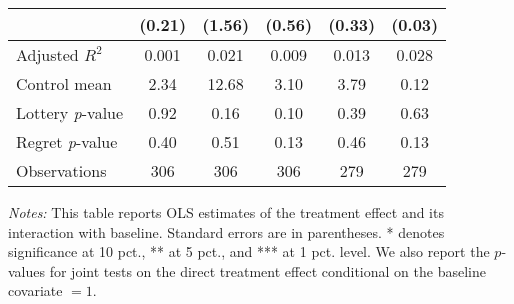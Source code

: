 \begin{table}[htbp]
{\begin{threeparttable}
\begin{tabular}{l*{5}{c}}
                &   (0.21)         &   (1.56)         &   (0.56)         &   (0.33)         &   (0.03)         \\
\midrule
Adjusted \(R^{2}\)&    0.001         &    0.021         &    0.009         &    0.013         &    0.028         \\
Control mean    &     2.34         &    12.68         &     3.10         &     3.79         &     0.12         \\
Lottery \emph{p}-value&     0.92         &     0.16         &     0.10         &     0.39         &     0.63         \\
Regret \emph{p}-value&     0.40         &     0.51         &     0.13         &     0.46         &     0.13         \\
Observations    &      306         &      306         &      306         &      279         &      279         \\
\bottomrule \end{tabular} \begin{tablenotes}[flushleft] \footnotesize \item \emph{Notes:} This table reports OLS estimates of the treatment effect and its interaction with baseline. Standard errors are in parentheses. * denotes significance at 10 pct., ** at 5 pct., and *** at 1 pct. level. We also report the \(p\)-values for joint tests on the direct treatment effect conditional on the baseline covariate $= 1$. \end{tablenotes} \end{threeparttable} } \end{table}
